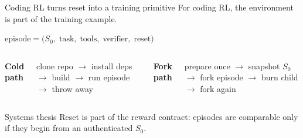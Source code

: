 \begin{frame}{Coding RL turns reset into a training primitive}
\large
For coding RL, the environment is part of the training example.

\vspace{0.3em}
\begin{center}
\Large
$\text{episode}=\big(S_0,\;\text{task},\;\text{tools},\;\text{verifier},\;\text{reset}\big)$
\end{center}

\vspace{0.4em}
\begin{columns}[T,onlytextwidth]
\textbf{Cold path}\par
\normalsize clone repo $\rightarrow$ install deps $\rightarrow$ build $\rightarrow$ run episode $\rightarrow$ throw away

\vspace{0.5em}

\textbf{Fork path}\par
\normalsize prepare once $\rightarrow$ snapshot $S_0$ $\rightarrow$ fork episode $\rightarrow$ burn child $\rightarrow$ fork again

\vspace{0.5em}
\end{columns}

\vspace{0.45em}
\begin{block}{Systems thesis}
\centering Reset is part of the reward contract: episodes are comparable only if they begin from an authenticated $S_0$.
\end{block}
\end{frame}

